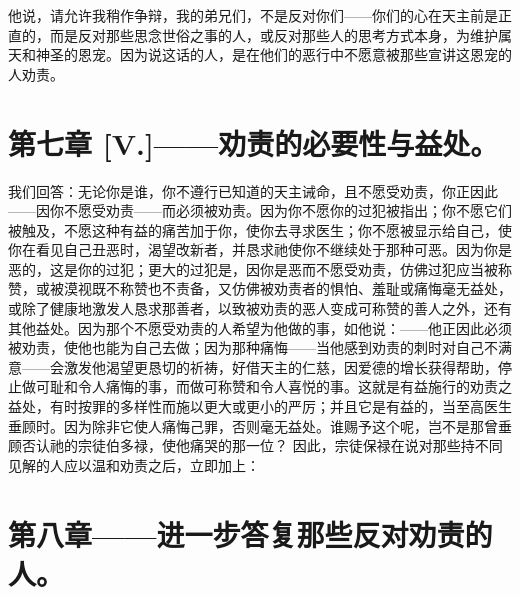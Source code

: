 他说，请允许我稍作争辩，我的弟兄们，不是反对你们——你们的心在天主前是正直的，而是反对那些思念世俗之事的人，或反对那些人的思考方式本身，为维护属天和神圣的恩宠。因为说这话的人，是在他们的恶行中不愿意被那些宣讲这恩宠的人劝责。\par


\section{第七章 [V.]——劝责的必要性与益处。}

我们回答：无论你是谁，你不遵行已知道的天主诫命，且不愿受劝责，你正因此——因你不愿受劝责——而必须被劝责。因为你不愿你的过犯被指出；你不愿它们被触及，不愿这种有益的痛苦加于你，使你去寻求医生；你不愿被显示给自己，使你在看见自己丑恶时，渴望改新者，并恳求祂使你不继续处于那种可恶。因为你是恶的，这是你的过犯；更大的过犯是，因你是恶而不愿受劝责，仿佛过犯应当被称赞，或被漠视既不称赞也不责备，又仿佛被劝责者的惧怕、羞耻或痛悔毫无益处，或除了健康地激发人恳求那善者，以致被劝责的恶人变成可称赞的善人之外，还有其他益处。因为那个不愿受劝责的人希望为他做的事，如他说：——他正因此必须被劝责，使他也能为自己去做；因为那种痛悔——当他感到劝责的刺时对自己不满意——会激发他渴望更恳切的祈祷，好借天主的仁慈，因爱德的增长获得帮助，停止做可耻和令人痛悔的事，而做可称赞和令人喜悦的事。这就是有益施行的劝责之益处，有时按罪的多样性而施以更大或更小的严厉；并且它是有益的，当至高医生垂顾时。因为除非它使人痛悔己罪，否则毫无益处。谁赐予这个呢，岂不是那曾垂顾否认祂的宗徒伯多禄，使他痛哭的那一位？ 因此，宗徒保禄在说对那些持不同见解的人应以温和劝责之后，立即加上：\par


\section{第八章——进一步答复那些反对劝责的人。}

